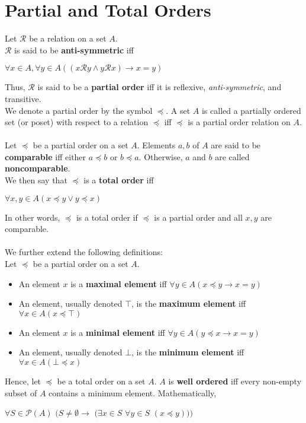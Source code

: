 \documentclass[a4paper]{article}
\begin{document}
\section{Partial and Total Orders}
Let $\mathcal{R}$ be a relation on a set $A$.\\
$\mathcal{R}$ is said to be \textbf{anti-symmetric} iff
\begin{center}
	$\forall x \in A, \forall y \in A ((x\mathcal{R}y \land y\mathcal{R}x) \rightarrow x = y)$
\end{center}
Thus, $\mathcal{R}$ is said to be a \textbf{partial order} iff it is reflexive, \textit{anti-symmetric}, and transitive.\\
We denote a partial order by the symbol $\preceq$. A set $A$ is called a partially ordered set (or poset) with respect to a relation $\preceq$ iff $\preceq$ is a partial order relation on $A$.\\ \\
Let $\preceq$ be a partial order on a set $A$. Elements $a, b$ of $A$ are said to be \textbf{comparable} iff either $a\preceq b$ or $b \preceq a$. Otherwise, $a$ and $b$ are called \textbf{noncomparable}.\\
We then say that $\preceq$ is a \textbf{total order} iff 
\begin{center}
	$\forall x,y \in A (x \preceq y \lor y \preceq x)$
\end{center}
In other words, $\preceq$ is a total order if $\preceq$ is a partial order and all $x, y$ are comparable.\\ \\
We further extend the following definitions:\\
Let $\preceq$ be a partial order on a set $A$.
\begin{itemize}
	\item An element $x$ is a \textbf{maximal element} iff $\forall y \in A (x \preceq y \rightarrow x = y)$
	\item An element, usually denoted $\top$, is the \textbf{maximum element} iff $\forall x \in A (x \preceq \top)$
	\item An element $x$ is a \textbf{minimal element} iff $\forall y \in A ( y\preceq x \rightarrow x = y)$
	\item An element, usually denoted $\bot$, is the \textbf{minimum element} iff $\forall x \in A (\bot \preceq x)$
\end{itemize}
Hence, let $\preceq$ be a total order on a set $A$. $A$ is \textbf{well ordered} iff every non-empty subset of $A$ contains a minimum element. Mathematically,
\begin{center}
$\forall S \in \mathcal{P}(A)$ $(S\neq \emptyset \rightarrow$ $(\exists x \in S$ $\forall y \in S$ $(x\preceq y)))$
\end{center}
\end{document}
